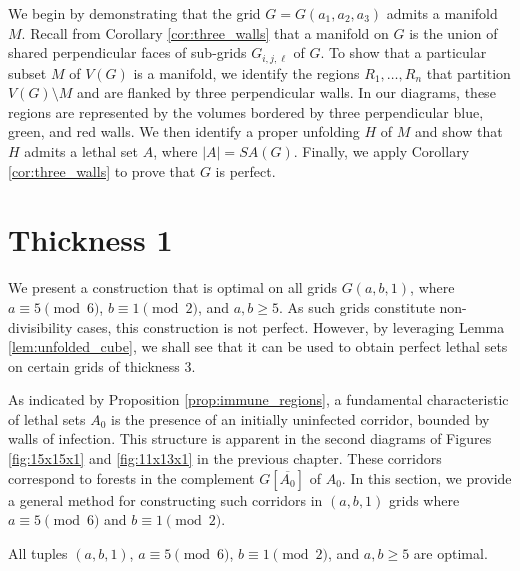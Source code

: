 We begin by demonstrating that the grid $G=G(a_1,a_2,a_3)$ admits a manifold $M$. Recall from Corollary \ref{cor:three_walls} that a manifold on $G$ is the union of shared perpendicular faces of sub-grids $G_{i,j,\ell}$ of $G$. To show that a particular subset $M$ of $V(G)$ is a manifold, we identify the regions $R_1, \dots, R_n$ that partition $V(G) \setminus M$ and are flanked by three perpendicular walls. In our diagrams, these regions are represented by the volumes bordered by three perpendicular blue, green, and red walls. We then identify a proper unfolding $H$ of $M$ and show that $H$ admits a lethal set $A$, where $|A| = SA(G)$. Finally, we apply Corollary \ref{cor:three_walls} to prove that $G$ is perfect. 


\section{Thickness 1}

We present a construction that is optimal on all grids $G(a,b,1)$, where $a \equiv 5 \pmod 6$, $b \equiv 1 \pmod 2$, and $a,b \geq 5$. As such grids constitute non-divisibility cases, this construction is not perfect. However, by leveraging Lemma \ref{lem:unfolded_cube}, we shall see that it can be used to obtain perfect lethal sets on certain grids of thickness 3. 

As indicated by Proposition \ref{prop:immune_regions}, a fundamental characteristic of lethal sets $A_0$ is the presence of an initially uninfected corridor, bounded by walls of infection. This structure is apparent in the second diagrams of Figures \ref{fig:15x15x1} and \ref{fig:11x13x1} in the previous chapter. These corridors correspond to forests in the complement $G[\overline{A_0}]$ of $A_0$. In this section, we provide a general method for constructing such corridors in $(a, b, 1)$ grids where $a \equiv 5 \pmod 6$ and $b \equiv 1 \pmod 2$.

\begin{con}
\label{con:snake}
All tuples $(a,b,1)$, $a \equiv 5 \pmod 6$, $b \equiv 1 \pmod 2$, and $a,b \geq 5$ are optimal.
\end{con}

